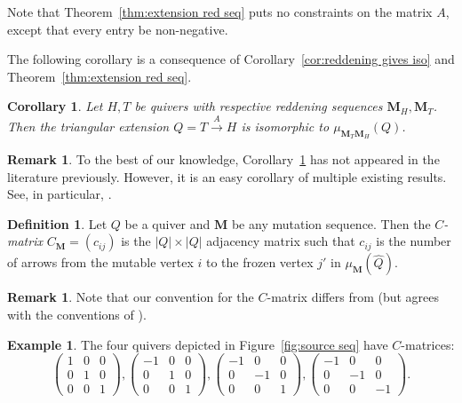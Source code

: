 \documentclass[11pt, letterpaper]{amsart}
\newtheorem{corollary}[theorem]{Corollary}
\theoremstyle{definition}
\newtheorem{remark}[theorem]{Remark}
\newtheorem{example}[theorem]{Example}
\newtheorem{definition}[theorem]{Definition}
\numberwithin{equation}{section}
\begin{document}
Note that Theorem~\ref{thm:extension red seq} puts no constraints on the matrix $A$, except that every entry be non-negative.

The following corollary is a consequence of Corollary~\ref{cor:reddening gives iso} and Theorem~\ref{thm:extension red seq}.

\begin{corollary}
\label{cor:extensions give iso cycles}
Let $H,T$ be quivers with respective reddening sequences $\mathbf{M}_H, \mathbf{M}_T$. 
Then the triangular extension $Q = T \stackrel{A}\rightarrow H$ is isomorphic to $\mu_{\mathbf{M}_T\mathbf{M}_H}(Q)$.
\end{corollary}

\begin{remark}
To the best of our knowledge, Corollary~\ref{cor:extensions give iso cycles} has not appeared in the literature previously. 
However, it is an easy corollary of multiple existing results.
See, in particular, \cite[Theorem~1.1]{MR4183151}.
\end{remark}

\begin{definition}
\label{def:C-mats}
Let $Q$ be a quiver and $\mathbf{M}$ be any mutation sequence.
Then the \emph{$C$-matrix} $C_{\mathbf{M}} = (c_{ij})$ is the $|Q| \times |Q|$ adjacency matrix such that $c_{ij}$ is the number of arrows from the mutable vertex $i$ to the frozen vertex $j'$ in $\mu_{\mathbf{M}}(\widehat{Q})$.
\end{definition}

\begin{remark}
Note that our convention for the $C$-matrix differs from \cite{MR4029226} (but agrees with the conventions of \cite{ervin2024unrestrictedredsizesigncoherence, MR4537352}). %
\end{remark}

\begin{example}
The four quivers depicted in Figure~\ref{fig:source seq} have $C$-matrices:
$$\begin{pmatrix} 1 & 0 & 0 \\ 0 & 1 & 0 \\ 0 & 0 & 1\end{pmatrix}, \begin{pmatrix} -1 & 0 & 0 \\ 0 & 1 & 0 \\ 0 & 0 & 1\end{pmatrix}, \begin{pmatrix} -1 & 0 & 0 \\ 0 & -1 & 0 \\ 0 & 0 & 1\end{pmatrix}, \begin{pmatrix} -1 & 0 & 0 \\ 0 & -1 & 0 \\ 0 & 0 & -1\end{pmatrix}.$$
\end{example}
\end{document}
